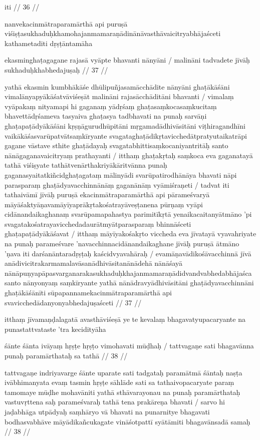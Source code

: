 iti  // 36  //

nanvekacinmātraparamārthā api puruṣā viśiṣṭasukhaduḥkhamohajanmamaraṇādinānāvasthāvaicitryabhājaśceti kathametaditi dṛṣṭāntamāha

ekasminghaṭagagane rajasā vyāpte bhavanti nānyāni  /
malināni tadvadete jīvāḥ sukhaduḥkhabhedajuṣaḥ  // 37  //

yathā ekasmin kumbhākāśe dhūlipuñjasamācchādite nānyāni ghaṭākāśāni vimalānyapyākāśatvāviśeṣāt malināni rajasācchāditāni bhavanti  / vimalaṃ vyāpakaṃ nityamapi hi gaganaṃ yādṛśaṃ ghaṭasaṃkocasaṃkucitaṃ bhavettādṛśameva tasyaiva ghaṭasya tadbhavati na punaḥ sarvāṇi ghaṭapaṭādyākāśāni kṛṣṇāgurudhūpitāni mṛgamadādhivāsitāni viṭhiragandhīni vaikākāśasvarūpatvātsaṃkīryante svagataghaṭādikṛtavicchedātpratyutaikatrāpi gagane vāstave sthite ghaṭādayaḥ svagatabhittisaṃkocaniyantritāḥ santo nānāgaganavaicitryaṃ prathayanti  / itthaṃ ghaṭakṛtaḥ saṃkoca eva gaganatayā tathā viśiṣyate tathātvenārthakriyākāritvānna punaḥ gaganasyaitatkiñcidghaṭagataṃ mālinyādi svarūpatirodhānāya bhavati nāpi parasparaṃ ghaṭādyavacchinnānāṃ gaganānāṃ vyāmiśraṇeti  / tadvat iti tathaivāmī jīvāḥ puruṣā ekacinmātraparamārthā api pārameśvaryā māyāśaktyāṇavamāyīyaprākṛtakośatrayāveṣṭanena pūrṇaṃ vyāpi cidānandaikaghanaṃ svarūpamapahastya parimitīkṛtā yenaikacaitanyātmāno 'pi svagatakośatrayavicchedadaurātmyātparasparaṃ bhinnāśceti ghaṭapaṭādyākāśavat  / itthaṃ māyīyakośakṛto viccheda eva jīvatayā vyavahriyate na punaḥ parameśvare 'navacchinnacidānandaikaghane jīvāḥ puruṣā ātmāno 'ṇava iti darśanāntaradṛṣṭaḥ kaścidvyavahāraḥ  / evamāṇavādikośāvacchinnā jīvā anādivicitrakarmamalavāsanādhivāsitanānādehā nānāśayā nānāpuṇyapāpasvarganarakasukhaduḥkhajanmamaraṇādidvandvabhedabhājaśca santo nānyonyaṃ saṃkīryante yathā nānādravyādhivāsitāni ghaṭādyavacchinnāni ghaṭākāśānīti sūpapannamekacinmātraparamārthā api svavicchedādanyonyabhedajuṣaśceti  // 37  //

itthaṃ jīvamaṇḍalagatā avasthāviśeṣā ye te kevalaṃ bhagavatyupacaryante na punastattvataste 'tra kecidityāha

śānte śānta ivāyaṃ hṛṣṭe hṛṣṭo vimohavati mūḍhaḥ  /
tattvagaṇe sati bhagavānna punaḥ paramārthataḥ sa tathā  // 38  //

tattvagaṇe indriyavarge śānte uparate sati tadgataḥ paramātmā śāntaḥ naṣṭa ivābhimanyata evaṃ tasmin hṛṣṭe sāhlāde sati sa tathaivopacaryate paraṃ tamomaye mūḍhe mohavāniti yathā sthāvarayonau na punaḥ paramārthataḥ vastuvṛttena saḥ parameśvaraḥ tathā tena prakāreṇa bhavati  / sarvo hi jaḍabhāga utpādyaḥ saṃhāryo vā bhavati na punarnitye bhagavati bodhasvabhāve māyādikañcukagate vināśotpattī syātāmiti bhagavānsadā samaḥ  // 38  //

